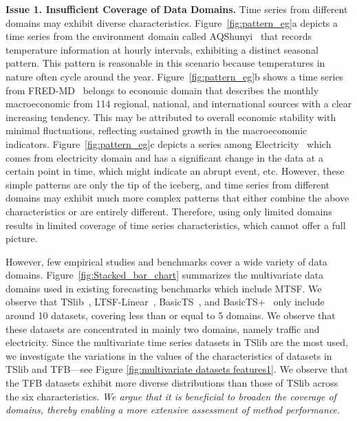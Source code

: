 \documentclass[sigconf, nonacm, pdfa]{acmart}
\def\qxf#1{\textcolor{blue}{[Xiangfei: #1]}}
\begin{document}
\noindent
\textbf{Issue 1. Insufficient Coverage of Data Domains.} Time series from different domains may exhibit diverse characteristics. Figure~\ref{fig:pattern_eg}a depicts a time series from the environment domain called AQShunyi~\cite{zhang2017cautionary} that records temperature information at hourly intervals, exhibiting a distinct seasonal pattern. This pattern is reasonable in this scenario because temperatures in nature often cycle around the year. 
Figure~\ref{fig:pattern_eg}b shows a time series from FRED-MD~\cite{mccracken2016fred} belongs to economic domain that describes the monthly macroeconomic from 114 regional, national, and international sources with a clear increasing tendency. This may be attributed to overall economic stability with minimal fluctuations, reflecting sustained growth in the macroeconomic indicators.
Figure~\ref{fig:pattern_eg}c depicts a series among Electricity~\cite{misc_electricityloaddiagrams20112014_321} which comes from electricity domain and has a significant change in the data at a certain point in time, which might indicate an abrupt event, etc. 
However, these simple patterns are only the tip of the iceberg, and time series from different domains may exhibit much more complex patterns that either combine the above characteristics or are entirely different.
Therefore, using only limited domains results in limited coverage of time series characteristics, which cannot offer a full picture.  

 

However, few empirical studies and benchmarks cover a wide variety of data domains. 
Figure~\ref{fig:Stacked_bar_chart} summarizes the multivariate data domains used in existing forecasting benchmarks which include MTSF. 
We observe that TSlib~\cite{wu2022timesnet}, LTSF-Linear~\cite{zeng2023transformers}, BasicTS~\cite{liang2022basicts}, and BasicTS+~\cite{shao2023exploring} only include around 10 datasets, covering less than or equal to 5 domains. We observe that these datasets are concentrated in mainly two domains, namely traffic and electricity. %
Since the multivariate time series datasets in TSlib are the most used, we investigate the variations in the values of the characteristics of datasets in TSlib and TFB---see Figure \ref{fig:multivariate datasets features1}. We observe that the TFB datasets exhibit more diverse distributions than those of TSlib across the six  characteristics. 
\textit{We argue that it is beneficial to broaden the coverage of domains, thereby enabling a more extensive assessment of method performance.}
\end{document}
